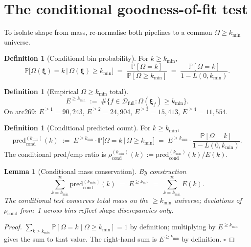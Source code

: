 \documentclass[11pt]{article}
\newcommand{\PROB}{\mathbb{P}}
\newcommand{\1}{\mathbf{1}}
\newcommand{\Prof}{\boldsymbol{\xi}}
\newcommand{\Om}{\Omega}
\newtheorem{lemma}[theorem]{Lemma}
\theoremstyle{definition}
\newtheorem{definition}[theorem]{Definition}
\begin{document}
\section{The conditional goodness-of-fit test}
\label{sec:cond}

To isolate shape from mass, re-normalise both pipelines to a common
$\Om\ge k_{\min}$ universe.

\begin{definition}[Conditional bin probability]\label{def:cond-P}
For $k\ge k_{\min}$,
\begin{equation}
\PROB\bigl[\Om(\Prof) = k \,\big|\, \Om(\Prof) \ge k_{\min}\bigr]
\;=\;
\frac{\PROB[\Om = k]}{\PROB[\Om\ge k_{\min}]}
\;=\;
\frac{\PROB[\Om = k]}{1 - L(0, k_{\min})}.
\label{eq:cond-prob}
\end{equation}
\end{definition}

\begin{definition}[Empirical $\Om\ge k_{\min}$ total]
\begin{equation}
E^{\ge k_{\min}}
\;:=\;
\#\{f \in \mathcal{D}_{\text{full}} : \Om(\Prof_f) \ge k_{\min}\}.
\label{eq:E-ge}
\end{equation}
On arc269: $E^{\ge 1} = 90{,}243$, $E^{\ge 2} = 24{,}904$,
$E^{\ge 3} = 15{,}413$, $E^{\ge 4} = 11{,}554$.
\end{definition}

\begin{definition}[Conditional predicted count]\label{def:cond}
For $k\ge k_{\min}$,
\begin{equation}
\mathrm{pred}_{\mathrm{cond}}^{(k_{\min})}(k)
\;:=\;
E^{\ge k_{\min}}
\cdot
\PROB\bigl[\Om = k \,\big|\, \Om\ge k_{\min}\bigr]
\;=\;
E^{\ge k_{\min}}
\cdot
\frac{\PROB[\Om = k]}{1 - L(0, k_{\min})}.
\label{eq:pred-cond}
\end{equation}
The conditional pred/emp ratio is
$\rho_{\mathrm{cond}}^{(k_{\min})}(k) := \mathrm{pred}_{\mathrm{cond}}^{(k_{\min})}(k) / E(k)$.
\end{definition}

\begin{lemma}[Conditional mass conservation]
By construction
\begin{equation}
\sum_{k = k_{\min}}^\infty
   \mathrm{pred}_{\mathrm{cond}}^{(k_{\min})}(k)
\;=\;
E^{\ge k_{\min}}
\;=\;
\sum_{k = k_{\min}}^\infty E(k).
\label{eq:cond-mass}
\end{equation}
The conditional test conserves total mass on the $\ge k_{\min}$
universe; deviations of $\rho_{\mathrm{cond}}$ from~1 across bins
reflect \emph{shape} discrepancies only.
\end{lemma}
\begin{proof}
$\sum_{k\ge k_{\min}} \PROB[\Om=k \mid \Om \ge k_{\min}] = 1$ by
definition; multiplying by $E^{\ge k_{\min}}$ gives the sum to that
value. The right-hand sum is $E^{\ge k_{\min}}$ by definition.
$\square$
\end{proof}
\end{document}
